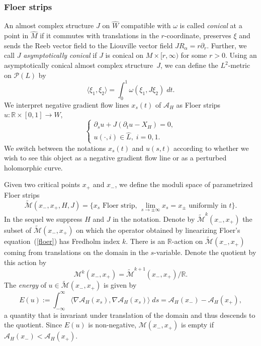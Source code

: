 \documentclass{amsart}
\newcommand{\Acal}{{\mathcal{A}}}
\newcommand{\Mcal}{{\mathcal{M}}}
\newcommand{\Pcal}{{\mathcal{P}}}
\newcommand{\RR}{\mathbb{R}}
\newcommand{\haat}{\widehat}
\newcommand{\tiilde}{\widetilde}
\theoremstyle{definition}
\theoremstyle{remark}
\numberwithin{equation}{section}
\begin{document}
\subsubsection*{Floer strips} 
An almost complex structure $J$ on $\haat W$ compatible with $\omega$ is called {\it conical}\/ at a point in $\haat M$ if it commutes with translations in the $r$-coordinate, preserves $\xi$ and sends the Reeb vector field to the Liouville vector field $J R_\alpha=r\partial_r$. Further, we call $J$ {\it asymptotically conical}\/ if $J$ is conical on $M\times[r,\infty)$ for some $r>0$. Using an asymptotically conical almost complex structure~$J$, we can define the $L^2$-metric on $\Pcal(L)$ by 
\begin{equation*}
	\langle \xi_1,\xi_2\rangle = \int_0^1\omega(\xi_1,J\xi_2)\; dt.
\end{equation*}
We interpret negative gradient flow lines $x_s(t)$ of $\Acal_H$ as Floer strips $u:\RR\times[0,1]\to\haat W$,
\begin{equation}\label{floer}
	\begin{cases}
		\partial_su+J(\partial_t u- X_H)=0,\\
		u(\cdot,i)\in\haat L,\; i=0,1.
	\end{cases}
\end{equation}
We switch between the notations $x_s(t)$ and $u(s,t)$ according to whether we wish to see this object as a negative gradient flow line or as a perturbed holomorphic curve. 

Given two critical points $x_+$ and $x_-$, we define the moduli space of parametrized Floer strips
\begin{equation*}
	\tiilde \Mcal(x_-,x_+,H,J)=\{\mbox{$x_s$ Floer strip, }\lim_{s\to\pm\infty}x_s=x_\pm\mbox{ uniformly in $t$}\}.
\end{equation*}
In the sequel we suppress $H$ and $J$ in the notation. Denote by $\tiilde \Mcal^k(x_-,x_+)$ the subset of $\tiilde \Mcal(x_-,x_+)$ on which the operator obtained by linearizing Floer's equation~(\ref{floer}) has Fredholm index $k$. 
There is an $\RR$-action on $\tiilde \Mcal(x_-,x_+)$ coming from translations on the domain in the $s$-variable. Denote the quotient by this action by
\begin{equation*}
	\Mcal^k(x_-,x_+)=\tiilde\Mcal^{k+1}(x_-,x_+)/\RR.
\end{equation*}
The {\it energy} of $u\in\tiilde\Mcal(x_-,x_+)$ is given by 
\begin{equation*}
	E(u):=\int_{-\infty}^\infty\langle\nabla\Acal_H(x_s),\nabla\Acal_H(x_s)\rangle\; ds=\Acal_H(x_-)-\Acal_H(x_+),
\end{equation*}
a quantity that is invariant under translation of the domain and thus descends to the quotient.
Since $E(u)$ is non-negative, $\Mcal(x_-,x_+)$ is empty if $\Acal_H(x_-)<\Acal_H(x_+)$.
\end{document}
